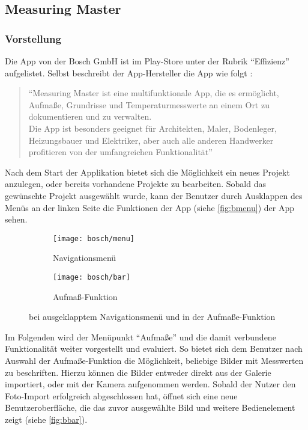 \subsection{Measuring Master}

\subsubsection{Vorstellung}
Die App \mm{} von der Bosch GmbH ist im Play-Store unter der Rubrik ``Effizienz'' aufgelistet.
Selbst beschreibt der App-Hersteller die App wie folgt \citep{BoschMM}:

\begin{quote}
  ``Measuring Master ist eine multifunktionale App, die es ermöglicht, Aufmaße, Grundrisse und Temperaturmesswerte an einem Ort zu dokumentieren und zu verwalten.\\
  Die App ist besonders geeignet für Architekten, Maler, Bodenleger, Heizungsbauer und Elektriker, aber auch alle anderen Handwerker profitieren von der umfangreichen Funktionalität''
\end{quote}

\noindent
Nach dem Start der Applikation bietet sich die Möglichkeit ein neues Projekt anzulegen, oder bereits vorhandene Projekte zu bearbeiten.
Sobald das gewünschte Projekt ausgewählt wurde, kann der Benutzer durch Ausklappen des Menüs an der linken Seite die Funktionen der App (siehe \autoref{fig:bmenu}) der App sehen. \\

\begin{figure}[h]
  \centering
  \begin{subfigure}[t]{0.4\textwidth}
    \texttt{[image: bosch/menu]}
    \caption{Navigationsmenü}\label{fig:bmenu}	
  \end{subfigure}
  \begin{subfigure}[t]{0.4\textwidth}
    \texttt{[image: bosch/bar]}
    \caption{Aufmaß-Funktion}\label{fig:bbar}
  \end{subfigure}
  \caption{\mm{} bei ausgeklapptem Navigationsmenü und in der Aufmaße-Funktion}
\end{figure}

Im Folgenden wird der Menüpunkt ``Aufmaße'' und die damit verbundene Funktionalität weiter vorgestellt und evaluiert.
So bietet sich dem Benutzer nach Auswahl der Aufmaße-Funktion die Möglichkeit, beliebige Bilder mit Messwerten zu beschriften.
Hierzu können die Bilder entweder direkt aus der Galerie importiert, oder mit der Kamera aufgenommen werden.
Sobald der Nutzer den Foto-Import erfolgreich abgeschlossen hat, öffnet sich eine neue Benutzeroberfläche, die das zuvor ausgewählte Bild und weitere Bedienelement zeigt (siehe \autoref{fig:bbar}). \\

